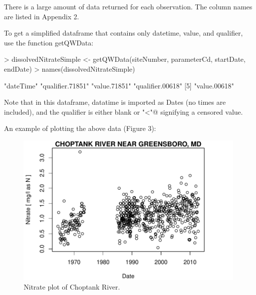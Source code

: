 \documentclass[a4paper,11pt]{article}
\begin{document}
There is a large amount of data returned for each observation. The column names are listed in Appendix 2.

To get a simplified dataframe that contains only datetime, value, and qualifier, use the function getQWData:

\begin{Schunk}
\begin{Sinput}
> dissolvedNitrateSimple <- getQWData(siteNumber, parameterCd, 
         startDate, endDate)
> names(dissolvedNitrateSimple)
\end{Sinput}
\begin{Soutput}
[1] "dateTime"        "qualifier.71851" "value.71851"     "qualifier.00618"
[5] "value.00618"    
\end{Soutput}
\end{Schunk}
Note that in this dataframe, datatime is imported as Dates (no times are included), and the qualifier is either blank or \verb@"<"@ signifying a censored value.

An example of plotting the above data (Figure 3):

\begin{Schunk}
\end{Schunk}

\begin{figure}
\begin{center}
\includegraphics{dataRetrieval-fig3}
\end{center}
\caption{Nitrate plot of Choptank River.}
\end{figure}
\end{document}
